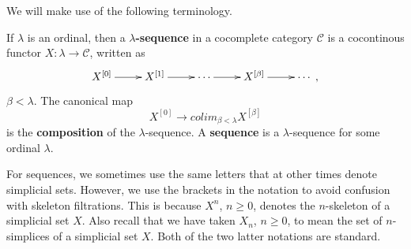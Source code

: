 We will make use of the following terminology.
\begin{definition}\label{def:hty_sequence}
If $\lambda$ is an ordinal, then a \textbf{$\lambda$-sequence} in a cocomplete category $\mathscr{C}$ is a cocontinous functor $X:\lambda \to \mathscr{C}$, written as
\begin{displaymath}
\xymatrix{
X^{[0]} \ar[r] & X^{[1]} \ar[r] & \cdots \ar[r] & X^{[\beta ]} \ar[r] & \cdots \; ,
}
\end{displaymath}
$\beta <\lambda$. The canonical map
\[X^{[0]}\to colim_{\beta <\lambda }X^{[\beta ]}\]
is the \textbf{composition} of the $\lambda$-sequence. A \textbf{sequence} is a $\lambda$-sequence for some ordinal $\lambda$.
\end{definition}
\noindent For sequences, we sometimes use the same letters that at other times denote simplicial sets. However, we use the brackets in the notation to avoid confusion with skeleton filtrations. This is because $X^n$, $n\geq 0$, denotes the $n$-skeleton of a simplicial set $X$. Also recall that we have taken $X_n$, $n\geq 0$, to mean the set of $n$-simplices of a simplicial set $X$. Both of the two latter notations are standard.


